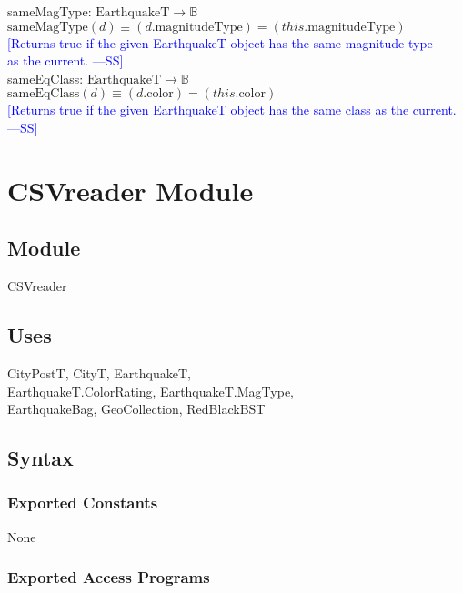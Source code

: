 \documentclass[12pt]{article}
\newcommand{\authornote}[3]{\textcolor{#1}{[#3 ---#2]}}
\newcommand{\authornote}[3]{}
\newcommand{\wss}[1]{\authornote{blue}{SS}{#1}}
\begin{document}
\noindent sameMagType: $\mbox{EarthquakeT} \rightarrow \mathbb{B}$\\
$\mbox{sameMagType}(d) \equiv (d.\mbox{magnitudeType}) = (this.\mbox{magnitudeType})$\\
\noindent \wss{Returns true if the given EarthquakeT object has the same magnitude type\\
 as the current.}\\

\noindent sameEqClass: $\mbox{EarthquakeT} \rightarrow \mathbb{B}$\\
$\mbox{sameEqClass}(d) \equiv (d.\mbox{color}) = (this.\mbox{color})$\\
\noindent \wss{Returns true if the given EarthquakeT object has the same class as the current.}\\

\newpage

\section* {CSVreader Module}

\subsection* {Module}

CSVreader

\subsection* {Uses}

CityPostT, CityT, EarthquakeT,\\
EarthquakeT.ColorRating, EarthquakeT.MagType,\\
EarthquakeBag, GeoCollection, RedBlackBST

\subsection* {Syntax}

\subsubsection* {Exported Constants}

None

\subsubsection* {Exported Access Programs}
\end{document}
